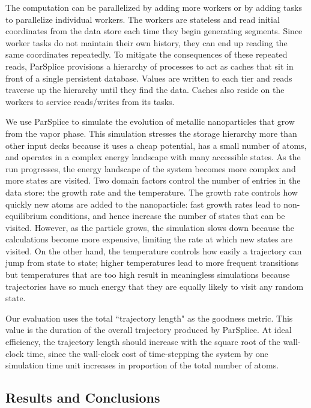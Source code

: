 The computation can be parallelized by adding more workers or by adding tasks
to parallelize individual workers.  The workers are stateless and read initial
coordinates from the data store each time they begin generating segments. Since
worker tasks do not maintain their own history, they can end up reading the
same coordinates repeatedly. To mitigate the consequences of these repeated
reads, ParSplice provisions a hierarchy of processes to act as caches that sit
in front of a single persistent database.  Values are written to each tier and
reads traverse up the hierarchy until they find the data.  Caches also reside
on the workers to service reads/writes from its tasks.  

We use ParSplice to simulate the evolution of metallic nanoparticles that grow
from the vapor phase.  This simulation stresses the storage hierarchy more than
other input decks because it uses a cheap potential, has a small number of
atoms, and operates in a complex energy landscape with many accessible states.
As the run progresses, the energy landscape of the system becomes more complex
and more states are visited.  Two domain factors control the number of entries
in the data store: the growth rate and the temperature. The growth rate
controls how quickly new atoms are added to the nanoparticle: fast growth rates
lead to non-equilibrium conditions, and hence increase the number of states
that can be visited.  However, as the particle grows, the simulation slows down
because the calculations become more expensive, limiting the rate at which new
states are visited.  On the other hand, the temperature controls how easily a
trajectory can jump from state to state; higher temperatures lead to more
frequent transitions but temperatures that are too high result in meaningless
simulations because trajectories have so much energy that they are equally
likely to visit any random state. 

Our evaluation uses the total ``trajectory length" as the goodness metric. This
value is the duration of the overall trajectory produced by ParSplice. At
ideal efficiency, the trajectory length should increase with the square root of
the wall-clock time, since the wall-clock cost of time-stepping the system by
one simulation time unit increases in proportion of the total number of atoms.

\subsection{Results and Conclusions}
\label{sec:parsplice-keyspace-analysis}

